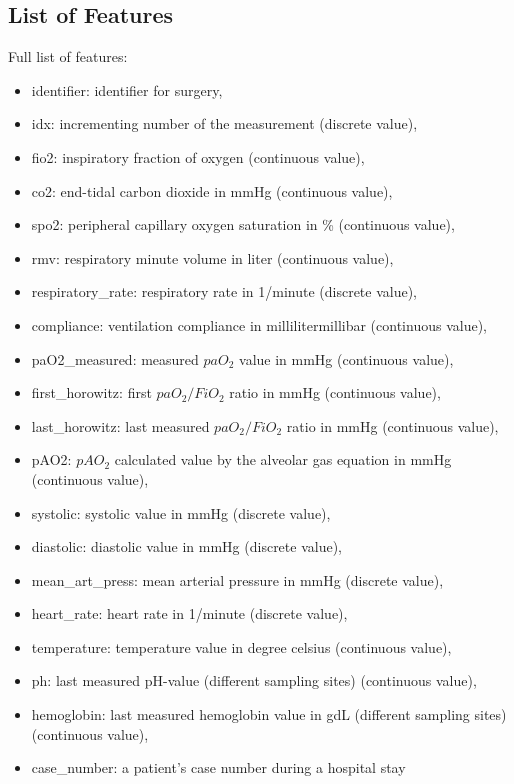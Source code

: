 \documentclass[referee,lineno,pdflatex,sn-nature]{sn-jnl}%
\theoremstyle{thmstyleone}%
\theoremstyle{thmstyletwo}%
\theoremstyle{thmstylethree}%
\begin{document}
\begin{appendices}
\section{List of Features}\label{secA2}
Full list of features:
\begin{itemize}
    \item identifier: identifier for surgery,
    \item idx: incrementing number of the measurement (discrete value),
    \item fio2: inspiratory fraction of oxygen (continuous value), 
    \item co2: end-tidal carbon dioxide in mmHg (continuous value), 
    \item spo2: peripheral capillary oxygen saturation in \% (continuous value),
    \item rmv: respiratory minute volume in liter (continuous value), 
    \item respiratory\_rate: respiratory rate in 1/minute (discrete value), 
    \item compliance: ventilation compliance in milliliter\/millibar (continuous value), 
    \item paO2\_measured: measured $paO_2$ value in mmHg (continuous value),
    \item first\_horowitz: first $paO_2/FiO_2$ ratio in mmHg (continuous value), 
    \item last\_horowitz: last measured $paO_2/FiO_2$ ratio in mmHg (continuous value),
    \item pAO2: $pAO_2$ calculated value by the alveolar gas equation in mmHg (continuous value), 
    \item systolic: systolic value in mmHg (discrete value), 
    \item diastolic: diastolic value in mmHg (discrete value), 
    \item mean\_art\_press: mean arterial pressure in mmHg (discrete value), 
    \item heart\_rate: heart rate in 1/minute (discrete value), 
    \item temperature: temperature value in degree celsius (continuous value),
    \item ph: last measured pH-value (different sampling sites) (continuous value), 
    \item hemoglobin: last measured hemoglobin value in g\/dL (different sampling sites) (continuous value), 
    \item case\_number: a patient’s case number during a hospital stay

\end{itemize}
\end{appendices}
\end{document}
